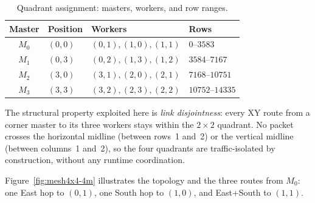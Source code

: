 \begin{table}[h]
\centering
\footnotesize
\caption{Quadrant assignment: masters, workers, and row ranges.}
\label{tab:quadrants}
\begin{tabular}{@{}clll@{}}
\toprule
Master & Position & Workers & Rows \\
\midrule
$M_0$ & $(0,0)$ & $(0,1),(1,0),(1,1)$ & $0$--$3583$ \\
$M_1$ & $(0,3)$ & $(0,2),(1,3),(1,2)$ & $3584$--$7167$ \\
$M_2$ & $(3,0)$ & $(3,1),(2,0),(2,1)$ & $7168$--$10751$ \\
$M_3$ & $(3,3)$ & $(3,2),(2,3),(2,2)$ & $10752$--$14335$ \\
\bottomrule
\end{tabular}
\end{table}

The structural property exploited here is \emph{link disjointness}: every XY
route from a corner master to its three workers stays within the $2\times2$
quadrant.  No packet crosses the horizontal midline (between rows~1 and~2) or
the vertical midline (between columns~1 and~2), so the four quadrants are
traffic-isolated by construction, without any runtime coordination.

Figure~\ref{fig:mesh4x4-4m} illustrates the topology and the three routes
from $M_0$: one East hop to $(0,1)$, one South hop to $(1,0)$, and
East+South to $(1,1)$.


